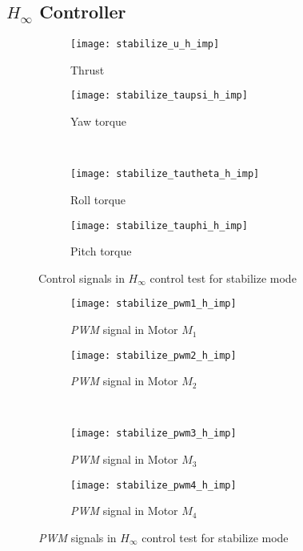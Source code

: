 \begin{appendices}
\subsection*{$H_\infty$ Controller}

\begin{figure}[H]
\begin{subfigure}{.5\linewidth}
\centering
\texttt{[image: stabilize\_u\_h\_imp]}
\caption{Thrust}
\label{fig:stabilize_u_h_imp}
\end{subfigure}%
\begin{subfigure}{.5\linewidth}
\centering
\texttt{[image: stabilize\_taupsi\_h\_imp]}
\caption{Yaw torque}
\label{fig:stabilize_taupsi_h_imp}
\end{subfigure}\\[1ex]
\begin{subfigure}{0.5\linewidth}
\centering
\texttt{[image: stabilize\_tautheta\_h\_imp]}
\caption{Roll torque}
\label{fig:stabilize_tautheta_h_imp}
\end{subfigure}
\begin{subfigure}{0.5\linewidth}
\centering
\texttt{[image: stabilize\_tauphi\_h\_imp]}
\caption{Pitch torque}
\label{fig:stabilize_tauphi_h_imp}
\end{subfigure}
\caption{Control signals in $H_\infty$ control test for stabilize mode}
\label{fig:stabilize_control_h}
\end{figure}

\begin{figure}[H]
\begin{subfigure}{.5\linewidth}
\centering
\texttt{[image: stabilize\_pwm1\_h\_imp]}
\caption{\textit{PWM} signal in Motor $M_1$}
\label{fig:stabilize_pwm_h_imp}
\end{subfigure}%
\begin{subfigure}{.5\linewidth}
\centering
\texttt{[image: stabilize\_pwm2\_h\_imp]}
\caption{\textit{PWM} signal in Motor $M_2$}
\label{fig:stabilize_pwm2_h_imp}
\end{subfigure}\\[1ex]
\begin{subfigure}{0.5\linewidth}
\centering
\texttt{[image: stabilize\_pwm3\_h\_imp]}
\caption{\textit{PWM} signal in Motor $M_3$}
\label{fig:stabilize_pwm3_h_imp}
\end{subfigure}
\begin{subfigure}{0.5\linewidth}
\centering
\texttt{[image: stabilize\_pwm4\_h\_imp]}
\caption{\textit{PWM} signal in Motor $M_4$}
\label{fig:stabilize_pwm4_h_imp}
\end{subfigure}
\caption{\textit{PWM} signals in $H_\infty$ control test for stabilize mode}
\label{fig:stabilize_pwm_h}
\end{figure}



\end{appendices}
